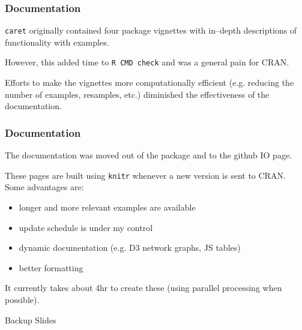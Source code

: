 \documentclass[12 pt]{beamer}\usepackage[]{graphicx}\usepackage[]{color}
\newcommand{\pkg}[1]{{\fontseries{b}\selectfont #1}}
\renewcommand{\pkg}[1]{{\color{darkgreen}\texttt{#1}}}
\begin{document}
  \begin{frame}[fragile]
\frametitle{Documentation}

\pkg{caret} originally contained four package vignettes with in--depth descriptions of functionality with examples.

\vspace{.15in}

However, this added time to \texttt{R CMD check} and was a general pain for CRAN.

\vspace{.15in}

Efforts to make the vignettes more computationally efficient (e.g. reducing the number of examples, resamples, etc.) diminished the effectiveness of the documentation.


\end{frame}


  \begin{frame}[fragile]
\frametitle{Documentation}

The documentation was moved out of the package and to the github IO page.

\vspace{.15in}


These pages are built using \pkg{knitr} whenever a new version is sent to CRAN. Some advantages are:

\begin{itemize}
\item longer and more relevant examples are available
\item update schedule is under my control
\item dynamic documentation (e.g. D3 network graphs, JS tables)
\item better formatting
\end{itemize}

\vspace{.1in}

It currently takes about 4hr to create these (using parallel processing when possible).

\end{frame}




\begin{frame}[plain]
\begin{center}
\LARGE Backup Slides
\end{center}
\end{frame}
\end{document}
